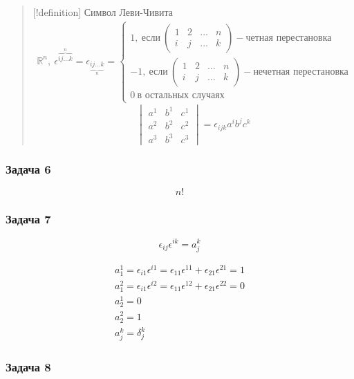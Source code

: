 \begin{quote}
{[}!definition{]} Символ Леви-Чивита $$\begin{gather}
\mathbb{R}^{n}, \ \epsilon^{\overbrace{ij\dots k}^{n}} = \epsilon_{\underbrace{ij\dots k}_{n}} = \begin{cases}
1, \ \text{если} \ \begin{pmatrix}
1 & 2 & \dots & n \\
i & j & \dots & k
\end{pmatrix} - \text{четная перестановка} \\
-1, \ \text{если} \ \begin{pmatrix}
1 & 2 & \dots & n \\
i & j & \dots & k
\end{pmatrix} - \text{нечетная перестановка} \\
0 \ \text{в остальных случаях}
\end{cases}
\end{gather}$$ $$\begin{vmatrix}
a^{1} & b^{1} & c^{1} \\
a^{2} & b^{2} & c^{2} \\
a^{3} & b^{3} & c^{3}
\end{vmatrix} = \epsilon_{ijk}a^{i}b^{j}c^{k}$$
\end{quote}

\subsubsection{Задача 6}

$$n!$$

\subsubsection{Задача 7}

$$\epsilon_{ij}\epsilon^{ik} = a_{j}^{k}$$

$$\begin{gather}
a_{1}^{1} = \epsilon_{i 1}\epsilon^{i1} = \epsilon_{11}\epsilon^{11} + \epsilon_{21}\epsilon^{21} = 1 \\
a_{1}^{2} = \epsilon_{i 1}\epsilon^{i 2} = \epsilon_{11}\epsilon^{12} + \epsilon_{21}\epsilon^{22} = 0 \\
a_{2}^{1} = 0 \\
a_{2}^{2} = 1 \\
a_{j}^{k} = \delta_{j}^{k}
\end{gather}$$

\subsubsection{Задача 8}

